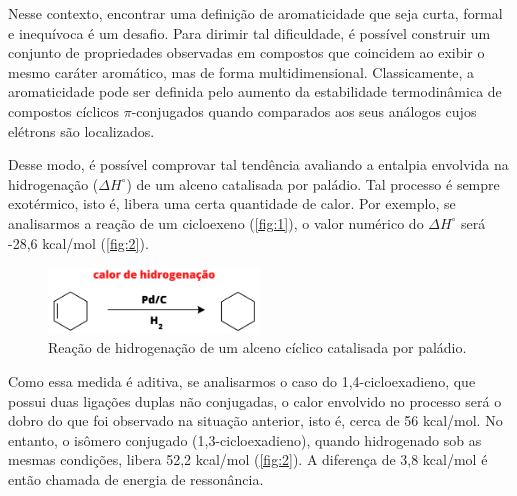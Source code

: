 Nesse contexto, encontrar uma definição de aromaticidade que seja curta, formal e inequívoca é um desafio. Para dirimir tal dificuldade, é possível construir um conjunto de propriedades observadas em compostos que coincidem ao exibir o mesmo caráter aromático, mas de forma multidimensional. Classicamente, a aromaticidade pode ser definida pelo aumento da estabilidade termodinâmica de compostos cíclicos $\pi$-conjugados quando comparados aos seus análogos cujos elétrons são localizados.

Desse modo, é possível comprovar tal tendência avaliando a entalpia envolvida na hidrogenação ($\Delta H^\circ$) de um alceno catalisada por paládio. Tal processo é sempre exotérmico, isto é, libera uma certa quantidade de calor. Por exemplo, se analisarmos a reação de um cicloexeno (\autoref{fig:1}), o valor numérico do $\Delta H^\circ$ será -28,6 kcal/mol (\autoref{fig:2}). 


\begin{figure}[htb]
	\caption{\label{fig:1} Reação de hidrogenação de um alceno cíclico catalisada por paládio.}
	\begin{center}
		\includegraphics[width=0.5\textwidth]{images/fig1.png}
	\end{center}
\end{figure}

Como essa medida é aditiva, se analisarmos o caso do 1,4-cicloexadieno, que possui duas ligações duplas não conjugadas, o calor envolvido no processo será o dobro do que foi observado na situação anterior, isto é, cerca de 56 kcal/mol. No entanto, o isômero conjugado (1,3-cicloexadieno), quando hidrogenado sob as mesmas condições, libera 52,2 kcal/mol (\autoref{fig:2}). A diferença de 3,8 kcal/mol é então chamada de energia de ressonância.

